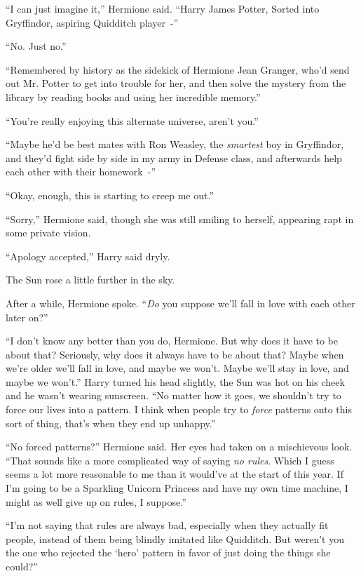 ``I can just imagine it,'' Hermione said. ``Harry James Potter, Sorted into Gryffindor, aspiring Quidditch player~-''

``No. Just no.''

``Remembered by history as the sidekick of Hermione Jean Granger, who'd send out Mr. Potter to get into trouble for her, and then solve the mystery from the library by reading books and using her incredible memory.''

``You're really enjoying this alternate universe, aren't you.''

``Maybe he'd be best mates with Ron Weasley, the \emph{smartest} boy in Gryffindor, and they'd fight side by side in my army in Defense class, and afterwards help each other with their homework~-''

``Okay, enough, this is starting to creep me out.''

``Sorry,'' Hermione said, though she was still smiling to herself, appearing rapt in some private vision.

``Apology accepted,'' Harry said dryly.

The Sun rose a little further in the sky.

After a while, Hermione spoke. ``\emph{Do} you suppose we'll fall in love with each other later on?''

``I don't know any better than you do, Hermione. But why does it have to be about that? Seriously, why does it always have to be about that? Maybe when we're older we'll fall in love, and maybe we won't. Maybe we'll stay in love, and maybe we won't.'' Harry turned his head slightly, the Sun was hot on his cheek and he wasn't wearing sunscreen. ``No matter how it goes, we shouldn't try to force our lives into a pattern. I think when people try to \emph{force} patterns onto this sort of thing, that's when they end up unhappy.''

``No forced patterns?'' Hermione said. Her eyes had taken on a mischievous look. ``That sounds like a more complicated way of saying \emph{no rules}. Which I guess seems a lot more reasonable to me than it would've at the start of this year. If I'm going to be a Sparkling Unicorn Princess and have my own time machine, I might as well give up on rules, I suppose.''

``I'm not saying that rules are always bad, especially when they actually fit people, instead of them being blindly imitated like Quidditch. But weren't you the one who rejected the `hero' pattern in favor of just doing the things she could?''

